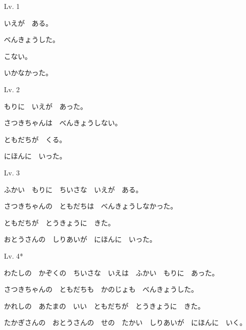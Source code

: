 
\author{Tomislav Mamić}

	
	\begin{mondai}{\noindent Lv. 1}
		\item いえが　ある。
		\item べんきょうした。
		\item こない。
		\item いかなかった。
	\end{mondai}
	\begin{mondai}{Lv. 2}
		\item もりに　いえが　あった。
		\item さつき\footnotemark[1]ちゃんは　べんきょうしない。
		\item ともだちが　くる。
		\item にほんに　いった。
	\end{mondai}
	\begin{mondai}{Lv. 3}
		\item ふかい　もりに　ちいさな　いえが　ある。
		\item さつきちゃんの　ともだちは　べんきょうしなかった。
		\item ともだちが　とうきょうに　きた。
		\item おとうさんの　しりあいが　にほんに　いった。
	\end{mondai}
	\begin{mondai}{Lv. 4*}
		\item わたしの　かぞくの　ちいさな　いえは　ふかい　もりに　あった。
		\item さつきちゃんの　ともだちも　かのじょも　べんきょうした。
		\item かれしの　あたまの　いい　ともだちが　とうきょうに　きた。
		\item たかぎ\footnotemark[2]さんの　おとうさんの　せの　たかい　しりあいが　にほんに　いく。
	\end{mondai}
	
